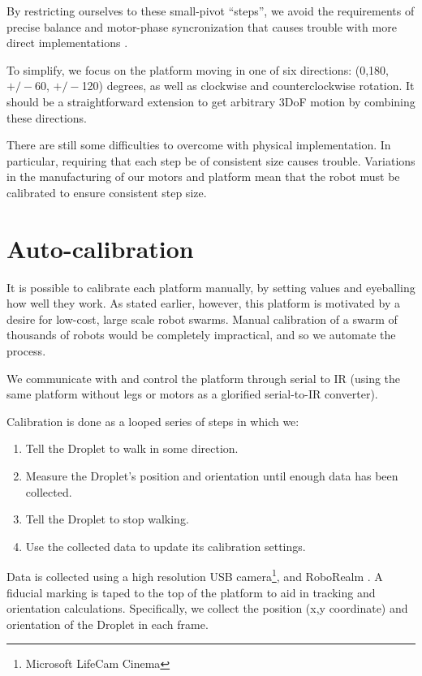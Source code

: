 \documentclass[letterpaper, 10pt, conference]{ieeeconf}
\begin{document}
By restricting ourselves to these small-pivot ``steps'', we avoid the requirements of precise balance and motor-phase syncronization that causes trouble with more direct implementations \cite{Vartholomeos2006}.

To simplify, we focus on the platform moving in one of six directions: (0,180, $+/-$60, $+/-$120) degrees, as well as clockwise and counterclockwise rotation. It should be a straightforward extension to get arbitrary 3DoF motion by combining these directions.

 There are still some difficulties to overcome with physical implementation. In particular, requiring that each step be of consistent size causes trouble. Variations in the manufacturing of our motors and platform mean that the robot must be calibrated to ensure consistent step size.

\section{Auto-calibration}

It is possible to calibrate each platform manually, by setting values and eyeballing how well they work. As stated earlier, however, this platform is motivated by a desire for low-cost, large scale robot swarms.  Manual calibration of a swarm of thousands of robots would be completely impractical, and so we automate the process.

We communicate with and control the platform through serial to IR (using the same platform without legs or motors as a glorified serial-to-IR converter). 

Calibration is done as a looped series of steps in which we:
\begin{enumerate}
\item Tell the Droplet to walk in some direction.
\item Measure the Droplet's position and orientation until enough data has been collected.
\item Tell the Droplet to stop walking.
\item Use the collected data to update its calibration settings.
\end{enumerate}
Data is collected using a high resolution USB camera\footnote{Microsoft LifeCam Cinema}, and RoboRealm \cite{RoboRealm}. A fiducial marking is taped to the top of the platform to aid in tracking and orientation calculations. Specifically, we collect the position (x,y coordinate) and orientation of the Droplet in each frame.
\end{document}
